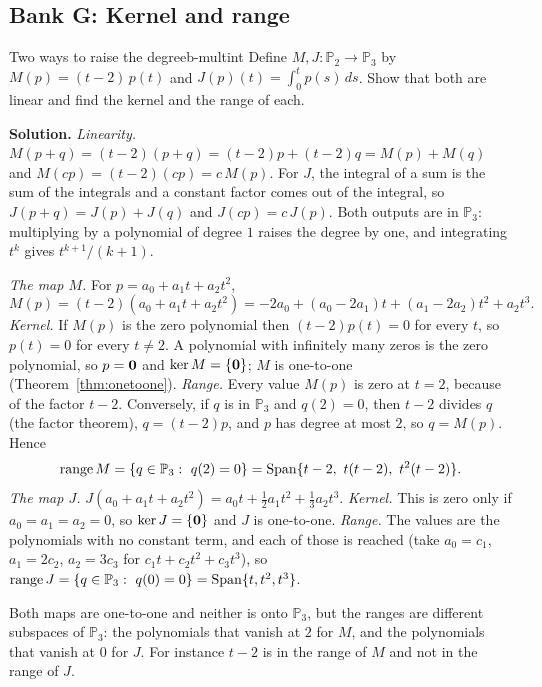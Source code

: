 \documentclass[11pt]{article}
\begin{document}
\subsection*{Bank G: Kernel and range}

\begin{exmp}{Two ways to raise the degree}{b-multint}
Define $M,J:\mathbb{P}_2\to\mathbb{P}_3$ by $M(p)=(t-2)\,p(t)$ and $J(p)(t)=\int_0^tp(s)\,ds$. Show that both are linear and find the kernel and the range of each.

\textbf{Solution.} \emph{Linearity.} $M(p+q)=(t-2)(p+q)=(t-2)p+(t-2)q=M(p)+M(q)$ and $M(cp)=(t-2)(cp)=c\,M(p)$. For $J$, the integral of a sum is the sum of the integrals and a constant factor comes out of the integral, so $J(p+q)=J(p)+J(q)$ and $J(cp)=c\,J(p)$. Both outputs are in $\mathbb{P}_3$: multiplying by a polynomial of degree $1$ raises the degree by one, and integrating $t^k$ gives $t^{k+1}/(k+1)$.

\emph{The map $M$.} For $p=a_0+a_1t+a_2t^2$,
\[
M(p)=(t-2)(a_0+a_1t+a_2t^2)=-2a_0+(a_0-2a_1)t+(a_1-2a_2)t^2+a_2t^3.
\]
\emph{Kernel.} If $M(p)$ is the zero polynomial then $(t-2)p(t)=0$ for every $t$, so $p(t)=0$ for every $t\neq2$. A polynomial with infinitely many zeros is the zero polynomial, so $p=\mathbf{0}$ and $\ker M=\{\mathbf{0}\}$; $M$ is one-to-one (Theorem~\ref{thm:onetoone}). \emph{Range.} Every value $M(p)$ is zero at $t=2$, because of the factor $t-2$. Conversely, if $q$ is in $\mathbb{P}_3$ and $q(2)=0$, then $t-2$ divides $q$ (the factor theorem), $q=(t-2)p$, and $p$ has degree at most $2$, so $q=M(p)$. Hence
\[
\operatorname{range}M=\{q\in\mathbb{P}_3:\ q(2)=0\}=\Span\{t-2,\ t(t-2),\ t^2(t-2)\}.
\]
\emph{The map $J$.} $J(a_0+a_1t+a_2t^2)=a_0t+\tfrac12a_1t^2+\tfrac13a_2t^3$. \emph{Kernel.} This is zero only if $a_0=a_1=a_2=0$, so $\ker J=\{\mathbf{0}\}$ and $J$ is one-to-one. \emph{Range.} The values are the polynomials with no constant term, and each of those is reached (take $a_0=c_1$, $a_1=2c_2$, $a_2=3c_3$ for $c_1t+c_2t^2+c_3t^3$), so $\operatorname{range}J=\{q\in\mathbb{P}_3:\ q(0)=0\}=\Span\{t,t^2,t^3\}$.

Both maps are one-to-one and neither is onto $\mathbb{P}_3$, but the ranges are different subspaces of $\mathbb{P}_3$: the polynomials that vanish at $2$ for $M$, and the polynomials that vanish at $0$ for $J$. For instance $t-2$ is in the range of $M$ and not in the range of $J$.
\end{exmp}
\end{document}
